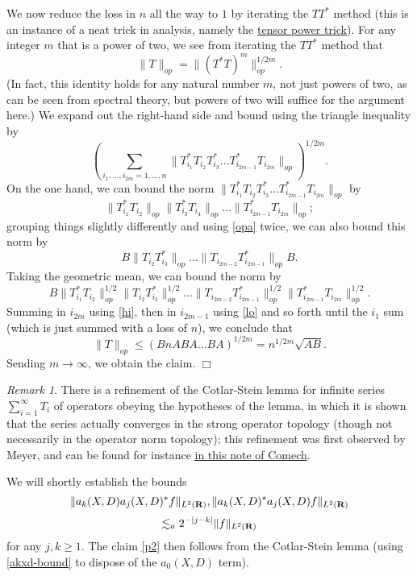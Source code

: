 \documentclass[11pt]{article}
\theoremstyle{definition}
\theoremstyle{remark}
\newtheorem{remark}[theorem]{Remark}
\begin{document}
We now reduce the loss in \({n}\) all the way to \({1}\) by iterating the \({TT^*}\) method (this is an instance of a neat trick in analysis, namely the \href{https://terrytao.wordpress.com/2008/08/25/tricks-wiki-article-the-tensor-product-trick/}{tensor power trick}). For any integer \({m}\) that is a power of two, we see from iterating the \({TT^*}\) method that 
\[\displaystyle  \| T \|_{op} = \| (T^* T)^m \|_{op}^{1/2m}.\]
 (In fact, this identity holds for any natural number \({m}\), not just powers of two, as can be seen from spectral theory, but powers of two will suffice for the argument here.) We expand out the right-hand side and bound using the triangle inequality by 
\[\displaystyle  (\sum_{i_1,\dots,i_{2m} = 1,\dots,n} \| T^*_{i_1} T_{i_2} T^*_{i_3} \dots T^*_{i_{2m-1}} T_{i_{2m}} \|_{op})^{1/2m}.\]
 On the one hand, we can bound the norm \({\| T^*_{i_1} T_{i_2} T^*_{i_3} \dots T^*_{i_{2m-1}} T_{i_{2m}} \|_{op}}\) by 
\[\displaystyle  \| T^*_{i_1} T_{i_2} \|_{op} \| T^*_{i_3} T_{i_4} \|_{op} \dots \| T^*_{i_{2m-1}} T_{i_{2m}} \|_{op};\]
 grouping things slightly differently and using \eqref{opa} twice, we can also bound this norm by 
\[\displaystyle  B \| T_{i_2} T^*_{i_3} \|_{op} \dots \| T_{i_{2m-2}} T^*_{i_{2m-1}} \|_{op} B.\]
 Taking the geometric mean, we can bound the norm by 
\[\displaystyle B \| T^*_{i_1} T_{i_2} \|_{op}^{1/2} \| T_{i_2} T^*_{i_3} \|_{op}^{1/2} \dots \| T_{i_{2m-2}} T^*_{i_{2m-1}} \|_{op}^{1/2} \| T^*_{i_{2m-1}} T_{i_{2m}} \|_{op}^{1/2}.\]
 Summing in \({i_{2m}}\) using \eqref{hi}, then in \({i_{2m-1}}\) using \eqref{lo} and so forth until the \({i_1}\) sum (which is just summed with a loss of \({n}\)), we conclude that 
\[\displaystyle  \|T\|_{op} \leq (B n A B A \dots B A)^{1/2m} = n^{1/2m} \sqrt{AB}.\]
 Sending \({m \rightarrow \infty}\), we obtain the claim. \(\Box\)
\begin{remark}
  There is a refinement of the Cotlar-Stein lemma for infinite series \({\sum_{i=1}^\infty T_i}\) of operators obeying the hypotheses of the lemma, in which it is shown that the series actually converges in the strong operator topology (though not necessarily in the operator norm topology); this refinement was first observed by Meyer, and can be found for instance \href{https://www.math.tamu.edu/~comech/papers/CotlarStein/CotlarStein.pdf}{in this note of Comech}. 
\end{remark}

We will shortly establish the bounds 
\[\displaystyle  \| a_k(X,D) a_j(X,D)^* f\|_{L^2({\bf R})}, \| a_k(X,D)^* a_j(X,D) f\|_{L^2({\bf R})} \]
\[\displaystyle \lesssim_{a} 2^{-|j-k|} \|f\|_{L^2({\bf R})}\]
 for any \({j,k \geq 1}\). The claim \eqref{p2} then follows from the Cotlar-Stein lemma (using \eqref{akxd-bound} to dispose of the \({a_0(X,D)}\) term).
\end{document}
